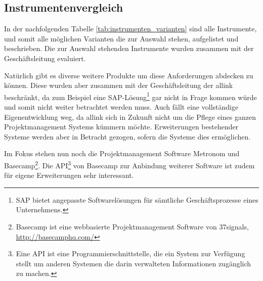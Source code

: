 \subsection{Instrumentenvergleich}
In der nachfolgenden Tabelle \ref{tab:instrumenten_varianten} sind alle
Instrumente, und somit alle möglichen Varianten die zur Auswahl stehen, aufgelistet 
und beschrieben. Die zur Auswahl stehenden Instrumente wurden zusammen mit der
Geschäftsleitung evaluiert.

Natürlich gibt es diverse weitere Produkte um diese
Anforderungen abdecken zu können. Diese wurden aber zusammen mit der Geschäftsleitung
der allink beschränkt, da zum Beispiel eine SAP-Lösung\footnote{SAP bietet angepasste
Softwarelösungen für sämtliche Geschäftsprozesse eines Unternehmens.} gar 
nicht in Frage kommen würde und somit nicht weiter betrachtet werden muss.
Auch fällt eine vollständige Eigenentwicklung weg, da allink sich in Zukunft nicht
um die Pflege eines ganzen Projektmanagement Systems kümmern möchte. Erweiterungen
bestehender Systeme werden aber in Betracht gezogen, sofern die Systeme dies
ermöglichen.

Im Fokus stehen nun noch die Projektmanagement Software Metronom und Basecamp\footnote{Basecamp
ist eine webbasierte Projektmanagement Software von 37signals, \url{http://basecamphq.com/}}.
Die API\footnote{Eine API ist eine Programmierschnittstelle, die ein System zur Verfügung 
stellt um anderen Systemen die darin verwalteten Informationen zugänglich zu machen.} 
von Basecamp zur Anbindung weiterer Software ist zudem für eigene Erweiterungen 
sehr interessant.

